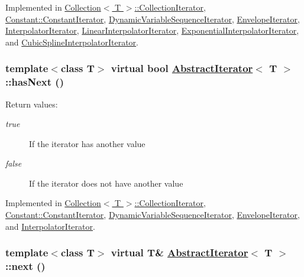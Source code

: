 Implemented in \hyperlink{classCollection_1_1CollectionIterator_a1}{Collection$<$ T $>$::Collection\-Iterator}, \hyperlink{classConstant_1_1ConstantIterator_a1}{Constant::Constant\-Iterator}, \hyperlink{classDynamicVariableSequenceIterator_a2}{Dynamic\-Variable\-Sequence\-Iterator}, \hyperlink{classEnvelopeIterator_a2}{Envelope\-Iterator}, \hyperlink{classInterpolatorIterator_a2}{Interpolator\-Iterator}, \hyperlink{classLinearInterpolatorIterator_a1}{Linear\-Interpolator\-Iterator}, \hyperlink{classExponentialInterpolatorIterator_a1}{Exponential\-Interpolator\-Iterator}, and \hyperlink{classCubicSplineInterpolatorIterator_a1}{Cubic\-Spline\-Interpolator\-Iterator}.\hypertarget{classAbstractIterator_a1}{
\subsubsection[hasNext]{\setlength{\rightskip}{0pt plus 5cm}template$<$class T$>$ virtual bool \hyperlink{classAbstractIterator}{Abstract\-Iterator}$<$ T $>$::has\-Next ()}}
\label{classAbstractIterator_a1}


\begin{Desc}
\item[Return values:]
\begin{description}
\item[{\em true}]If the iterator has another value \item[{\em false}]If the iterator does not have another value \end{description}
\end{Desc}


Implemented in \hyperlink{classCollection_1_1CollectionIterator_a2}{Collection$<$ T $>$::Collection\-Iterator}, \hyperlink{classConstant_1_1ConstantIterator_a2}{Constant::Constant\-Iterator}, \hyperlink{classDynamicVariableSequenceIterator_a3}{Dynamic\-Variable\-Sequence\-Iterator}, \hyperlink{classEnvelopeIterator_a3}{Envelope\-Iterator}, and \hyperlink{classInterpolatorIterator_a3}{Interpolator\-Iterator}.\hypertarget{classAbstractIterator_a2}{
\subsubsection[next]{\setlength{\rightskip}{0pt plus 5cm}template$<$class T$>$ virtual T\& \hyperlink{classAbstractIterator}{Abstract\-Iterator}$<$ T $>$::next ()}}
\label{classAbstractIterator_a2}


